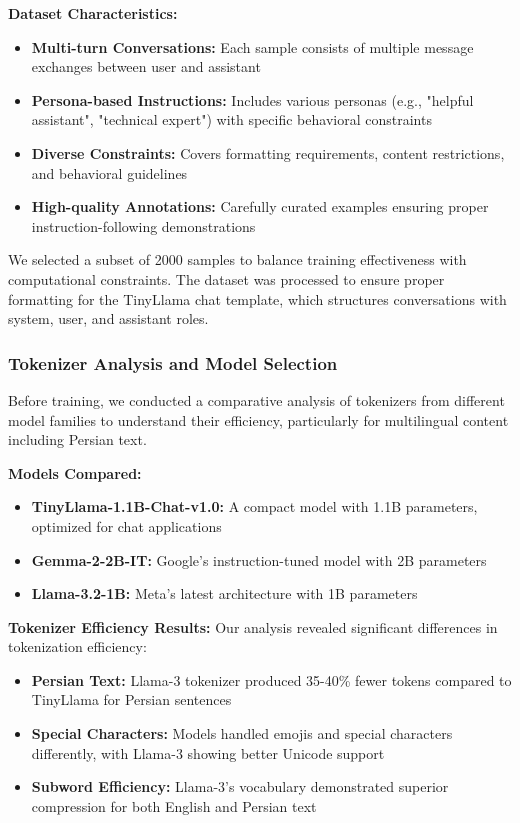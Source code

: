 \textbf{Dataset Characteristics:}
\begin{itemize}
    \item \textbf{Multi-turn Conversations:} Each sample consists of multiple message exchanges between user and assistant
    \item \textbf{Persona-based Instructions:} Includes various personas (e.g., "helpful assistant", "technical expert") with specific behavioral constraints
    \item \textbf{Diverse Constraints:} Covers formatting requirements, content restrictions, and behavioral guidelines
    \item \textbf{High-quality Annotations:} Carefully curated examples ensuring proper instruction-following demonstrations
\end{itemize}

We selected a subset of 2000 samples to balance training effectiveness with computational constraints. The dataset was processed to ensure proper formatting for the TinyLlama chat template, which structures conversations with system, user, and assistant roles.

\subsubsection{Tokenizer Analysis and Model Selection}
Before training, we conducted a comparative analysis of tokenizers from different model families to understand their efficiency, particularly for multilingual content including Persian text.

\textbf{Models Compared:}
\begin{itemize}
    \item \textbf{TinyLlama-1.1B-Chat-v1.0:} A compact model with 1.1B parameters, optimized for chat applications
    \item \textbf{Gemma-2-2B-IT:} Google's instruction-tuned model with 2B parameters
    \item \textbf{Llama-3.2-1B:} Meta's latest architecture with 1B parameters
\end{itemize}

\textbf{Tokenizer Efficiency Results:}
Our analysis revealed significant differences in tokenization efficiency:
\begin{itemize}
    \item \textbf{Persian Text:} Llama-3 tokenizer produced 35-40\% fewer tokens compared to TinyLlama for Persian sentences
    \item \textbf{Special Characters:} Models handled emojis and special characters differently, with Llama-3 showing better Unicode support
    \item \textbf{Subword Efficiency:} Llama-3's vocabulary demonstrated superior compression for both English and Persian text
\end{itemize}


